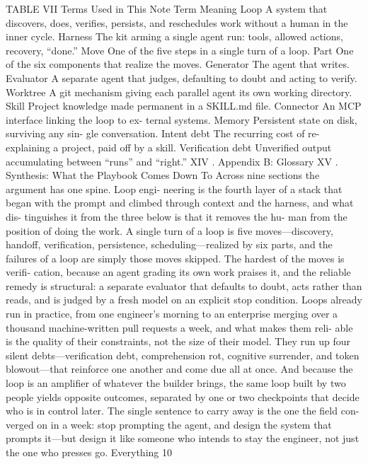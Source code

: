 \documentclass[conference]{IEEEtran}
\begin{document}
TABLE VII
Terms Used in This Note
Term Meaning
Loop A system that discovers, does, verifies,
persists, and reschedules work without a
human in the inner cycle.
Harness The kit arming a single agent run: tools,
allowed actions, recovery, “done.”
Move One of the five steps in a single turn of a
loop.
Part One of the six components that realize
the moves.
Generator The agent that writes.
Evaluator A separate agent that judges, defaulting
to doubt and acting to verify.
Worktree A git mechanism giving each parallel
agent its own working directory.
Skill Project knowledge made permanent in a
SKILL.md file.
Connector An MCP interface linking the loop to ex-
ternal systems.
Memory Persistent state on disk, surviving any sin-
gle conversation.
Intent debt The recurring cost of re-explaining a
project, paid off by a skill.
Verification
debt
Unverified output accumulating between
“runs” and “right.”
XIV . Appendix B: Glossary
XV . Synthesis: What the Playbook Comes Down To
Across nine sections the argument has one spine. Loop engi-
neering is the fourth layer of a stack that began with the prompt
and climbed through context and the harness, and what dis-
tinguishes it from the three below is that it removes the hu-
man from the position of doing the work. A single turn of a
loop is five moves—discovery, handoff, verification, persistence,
scheduling—realized by six parts, and the failures of a loop are
simply those moves skipped. The hardest of the moves is verifi-
cation, because an agent grading its own work praises it, and the
reliable remedy is structural: a separate evaluator that defaults to
doubt, acts rather than reads, and is judged by a fresh model on
an explicit stop condition. Loops already run in practice, from
one engineer’s morning to an enterprise merging over a thousand
machine-written pull requests a week, and what makes them reli-
able is the quality of their constraints, not the size of their model.
They run up four silent debts—verification debt, comprehension
rot, cognitive surrender, and token blowout—that reinforce one
another and come due all at once. And because the loop is an
amplifier of whatever the builder brings, the same loop built by
two people yields opposite outcomes, separated by one or two
checkpoints that decide who is in control later.
The single sentence to carry away is the one the field con-
verged on in a week: stop prompting the agent, and design the
system that prompts it—but design it like someone who intends
to stay the engineer, not just the one who presses go. Everything
10
\end{document}
